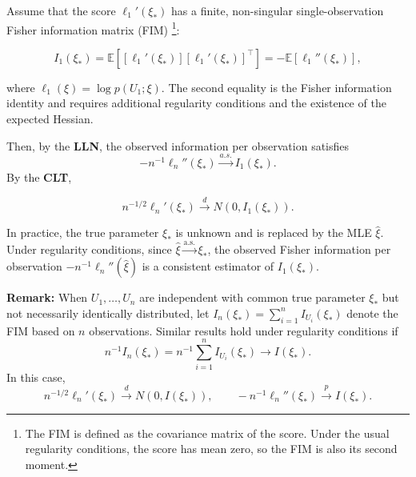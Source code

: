 \documentclass{article}
\newenvironment{mybox}{%
  \par\addvspace{10pt}%
  \begin{mdframed}[skipabove=0pt,skipbelow=10pt]%
}{%
  \end{mdframed}%
}
\theoremstyle{break}
\newcommand{\E}{\ensuremath{\mathbb{E}}}
\begin{document}
Assume that the score $\ell_1'(\xi_*)$ has a finite, non-singular single-observation Fisher information matrix (FIM)
\footnote{The FIM is defined as the covariance matrix of the score. Under the usual regularity conditions, the score has mean zero, so the FIM is also its second moment.}:
\begin{mybox}
\begin{equation}\label{eq:singe-FIM}
    I_1(\xi_*)
    =
    \E\left[
        [\ell_1'(\xi_*)][\ell_1'(\xi_*)]^\top
    \right]
    =
    -\E\left[\ell_1''(\xi_*)\right],
\end{equation}
\end{mybox}
where $\ell_1(\xi)=\log p(U_1;\xi)$. The second equality is the Fisher information identity and requires additional regularity conditions and the existence of the expected Hessian.

Then, by the \textbf{LLN}, the observed information per observation satisfies
\[
    -n^{-1}\ell_n''(\xi_*)
    \stackrel{a.s.}{\to}
    I_1(\xi_*).
\]
By the \textbf{CLT},
\begin{mybox}
\begin{equation}\label{eq:CLT_scores}
    n^{-1/2}\ell_n'(\xi_*)
    \stackrel{d}{\to}
    N\left(0,I_1(\xi_*)\right).
\end{equation}
\end{mybox}
In practice, the true parameter $\xi_*$ is unknown and is replaced by the MLE $\hat\xi$. Under regularity conditions, since $\hat\xi \stackrel{\mathrm{a.s.}}{\to} \xi_*$, the observed Fisher information per observation $-n^{-1}\ell_n''(\hat\xi)$ is a consistent estimator of $I_1(\xi_*)$.

\textbf{Remark:} When $U_1,\ldots,U_n$ are independent with common true parameter $\xi_*$ but not necessarily identically distributed, let $I_n(\xi_*)=\sum_{i=1}^n I_{U_i}(\xi_*)$ denote the FIM based on $n$ observations. Similar results hold under regularity conditions if
\[
    n^{-1} I_n(\xi_*) = n^{-1} \sum_{i=1}^n I_{U_i}(\xi_*)
    \to I(\xi_*).
\]
In this case,
\[
    n^{-1/2}\ell_n'(\xi_*)
    \stackrel{d}{\to}
    N\left(0,I(\xi_*)\right),
    \qquad
    -n^{-1}\ell_n''(\xi_*)
    \stackrel{p}{\to}
    I(\xi_*).
\]
\end{document}
